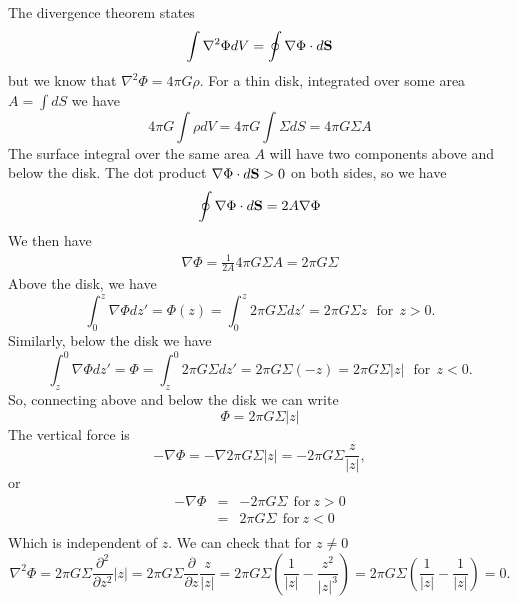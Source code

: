 \documentclass[]{article}
\begin{document}
The divergence theorem states
\begin{equation}
\int \nabla^2 \Phi dV = \oint \nabla \Phi \cdot d\mathbf{S}
\end{equation}
\noindent
but we know that $\nabla^2 \Phi = 4\pi G \rho$.
For a thin disk, integrated over some area $A = \int dS$ we have
\begin{equation}
4\pi G \int \rho dV = 4\pi G \int \Sigma dS = 4\pi G \Sigma A
\end{equation}
\noindent
The surface integral over the same area $A$ will have two
components above and below the disk.  The dot product
$\nabla \Phi \cdot d\mathbf{S}>0$ on both sides, so we have
\begin{equation}
\oint \nabla \Phi \cdot d\vS = 2 A \nabla \Phi %
\end{equation}
\noindent
We then have
\begin{eqnarray}
\nabla \Phi = \frac{1}{2A} 4 \pi G \Sigma A = 2\pi G \Sigma
\end{eqnarray}
\noindent
Above the disk, we have
\begin{equation}
\int_0^{z} \nabla \Phi dz' = \Phi(z) = \int_{0}^{z} 2\pi G \Sigma dz' = 2\pi G \Sigma z~~~\mathrm{for}~~z>0.
\end{equation}
Similarly, below the disk we have
\begin{equation}
\int_{z}^{0} \nabla \Phi dz' = \Phi = \int_{z}^{0} 2\pi G \Sigma dz' = 2\pi G \Sigma (-z) =2\pi G \Sigma|z|  ~~~\mathrm{for}~~z<0.
\end{equation}
\noindent
So, connecting above and below the disk we can write
\begin{equation}
\Phi = 2\pi G \Sigma|z| 
\end{equation}
\noindent
The vertical force is
\begin{equation}
-\nabla \Phi = -\nabla 2\pi G \Sigma|z| = -2 \pi G \Sigma \frac{z}{|z|},
\end{equation}
\noindent
or
\begin{eqnarray}
-\nabla \Phi &=& -2\pi G \Sigma~~\mathrm{for}~z>0\\
&=& 2\pi G \Sigma~~\mathrm{for}~z<0\\
\end{eqnarray}
\noindent
Which is independent of $z$.
\noindent
We can check that for $z\ne0$
\begin{equation}
\nabla^2 \Phi = 2\pi G \Sigma \frac{\partial^2}{\partial z^2}|z| = 2\pi G \Sigma \frac{\partial}{\partial z}\frac{z}{|z|} = 2\pi G \Sigma \left(\frac{1}{|z|} - \frac{z^2}{|z|^3} \right) =  2\pi G \Sigma \left(\frac{1}{|z|} - \frac{1}{|z|} \right) = 0.
\end{equation}
\end{document}
